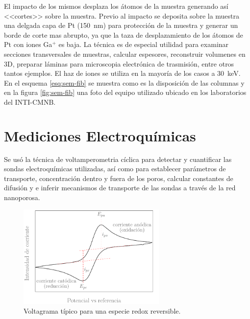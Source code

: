 		El impacto de los mismos desplaza los átomos de la muestra generando así <<cortes>> sobre la muestra. Previo al impacto se deposita sobre la muestra una delgada capa de Pt (\SI{150}{\nm}) para protección de la muestra y generar un borde de corte mas abrupto, ya que la taza de desplazamiento de los átomos de Pt con iones Ga${^+}$ es baja.\cite{Giannuzzi2005} La técnica es de especial utilidad para examinar secciones transversales de muestras, calcular espesores, reconstruir volumenes en 3D, preparar láminas para microscopia electrónica de trasmisión, entre otros tantos ejemplos. El haz de iones se utiliza en la mayoría de los casos a \SI{30}{\kilo\electronvolt}. En el esquema \ref{esq:sem-fib} se muestra como es la disposición de las columnas y en la figura \ref{fig:sem-fib} una foto del equipo utilizado ubicado en los laboratorios del INTI-CMNB.

\section{Mediciones Electroquímicas}\label{sec:medidas_eq}
	
	 Se usó la técnica de voltamperometria cíclica para detectar y cuantificar las sondas electroquímicas utilizadas, así como para establecer parámetros de transporte, concentración dentro y fuera de los poros, calcular constantes de difusión y e inferir mecanismos de transporte de las sondas a través de la red nanoporosa.\cite{Wi2000,Skoog1995,Gewirth2004} 


			\begin{figure}[ht]
			 		  \begin{center}
			 		  \includegraphics[width=0.65\textwidth]{Esquemas/CV_ideal.pdf}
			 		  \caption[Voltamperograma ideal]{Voltagrama típico para una especie redox reversible.}
			 		  \label{fig:CV_ideal}
			 		  \end{center}
			 		  \end{figure}

